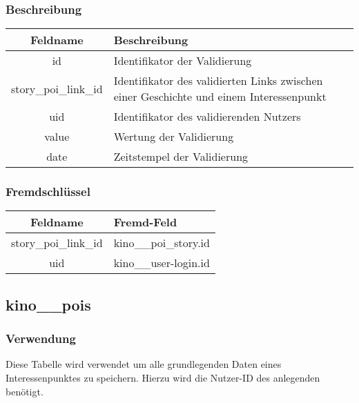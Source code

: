 \subsubsection{Beschreibung}
\begin{table}[H]
	\begin{tabular}{|c|p{12cm}|}
		\hline
		\textbf{Feldname} & \textbf{Beschreibung} \\ \hline
		id & Identifikator der Validierung \\ \hline
		story\_poi\_link\_id & Identifikator des validierten Links zwischen einer Geschichte und einem Interessenpunkt \\ \hline
		uid & Identifikator des validierenden Nutzers \\ \hline
		value & Wertung der Validierung \\ \hline
		date & Zeitstempel der Validierung \\ \hline
	\end{tabular}
\end{table}
\subsubsection{Fremdschlüssel}
\begin{table}[H]
	\begin{tabular}{|c|p{12.5cm}|}
		\hline
		\textbf{Feldname} & \textbf{Fremd-Feld} \\ \hline
		story\_poi\_link\_id & kino\_\_poi\_story.id \\ \hline
		uid & kino\_\_user-login.id \\ \hline
	\end{tabular}
\end{table}
\subsection{kino\_\_pois}
\subsubsection{Verwendung} Diese Tabelle wird verwendet um alle grundlegenden Daten eines Interessenpunktes zu speichern. Hierzu wird die Nutzer-ID des anlegenden benötigt.
